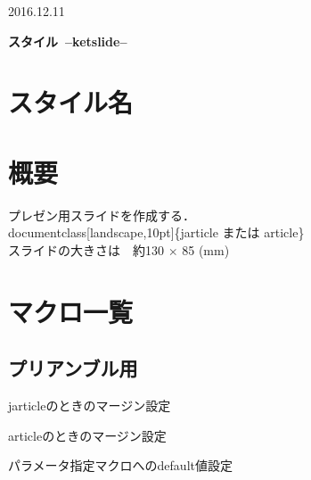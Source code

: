 \documentclass[a4j]{jarticle}
\begin{document}
\begin{flushright}
2016.12.11
\end{flushright}


\begin{center}
{\bf \huge \ketpic スタイル\ --ketslide--}\vspace{3mm}\\
\end{center}

\section{スタイル名}

\section{概要}

プレゼン用スライドを作成する．\\
\hspace*{2zw}\bs documentclass[landscape,10pt]\{jarticle または article\}\\
\hspace*{2zw}スライドの大きさは　約130 $\times$ 85 (mm)


\section{マクロ一覧}

\subsection{プリアンブル用}

jarticleのときのマージン設定

articleのときのマージン設定

パラメータ指定マクロへのdefault値設定
\end{document}
